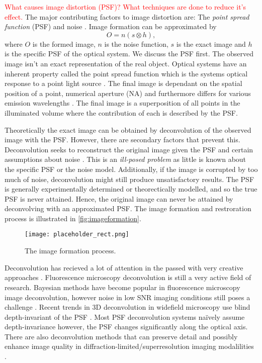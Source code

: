 \begin{definition}
	\textcolor{red}{What causes image distortion (PSF)? What techniques are done to reduce it's effect.}
	The major contributing factors to image distortion are: The \textit{point spread function} (PSF) and noise \citep{Sarder2006}.
	Image formation can be approximated by 
	\begin{equation}
		O = n(s \otimes h),
	\end{equation}
	where $O$ is the formed image, $n$ is the noise function, $s$ is the exact image and $h$ is the specific PSF of the optical system.
	We discuss the PSF first.
	The observed image isn't an exact representation of the real object.
	Optical systems have an inherent property called the point spread function which is the systems optical response to a point light source \citep{Danek2012}.
	The final image is dependant on the spatial position of a point, numerical aperture (NA) and furthermore differs for various emission wavelengths \citep{Hubeny2008,Keuper2012}.
	The final image is a superposition of all points in the illuminated volume where the contribution of each is described by the PSF.
	
	Theoretically the exact image can be obtained by deconvolution of the observed image with the PSF.
	However, there are secondary factors that prevent this.
	Deconvolution seeks to reconstruct the original image given the PSF and certain assumptions about noise \citep{Keuper2012}.
	This is an \textit{ill-posed problem} as little is known about the specific PSF or the noise model.
	Additionally, if the image is corrupted by too much of noise, deconvolution might still produce unsatisfactory results.
	The PSF is generally experimentally determined or theorectically modelled, and so the true PSF is never attained.
	Hence, the original image can never be attained by deconvolving with an approximated PSF.
	The image formation and restroration process is illustrated in \autoref{fig:imageformation}.
	
	\begin{figure}[!t]
		\centering
		\texttt{[image: placeholder\_rect.png]}
		\caption{The image formation process.}
		\label{fig:imageformation}
	\end{figure}
	
	Deconvolution has recieved a lot of attention in the passed with very creative approaches \citep{Mukamel2012,Verveer2007,Periasamy1999,Swedlow2007,Rooi2014}.
	Fluorescence microscopy deconvolution is still a very active field of research.
	Bayesian methods have become popular in fluorescence microscopy image deconvolution, however noise in low SNR imaging conditions still poses a challenge \citep{Wong2015}.
	Recent trends in 3D deconvolution in widefield microscopy use blind depth-invariant of the PSF \citep{Kim2015}.
	Most PSF deconvolution systems na{\"i}vely assume depth-invariance however, the PSF changes significantly along the optical axis.
	There are also deconvolution methods that can preserve detail and possibly enhance image quality in diffraction-limited/superresolution imaging modalilities \citep{Qin2016}.
\end{definition}

